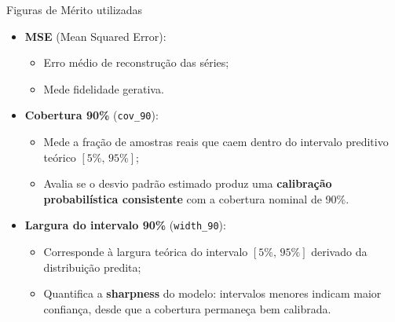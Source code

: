 \documentclass[10pt,aspectratio=169]{beamer}
\begin{document}
  \begin{frame}{Figuras de Mérito utilizadas}
     \begin{itemize}
    \item \textbf{MSE} (Mean Squared Error):
      \begin{itemize}
         \item Erro médio de reconstrução das séries;
    \item Mede fidelidade gerativa.
      \end{itemize}

  \item \textbf{Cobertura 90\%} (\texttt{cov\_90}):
  \begin{itemize}
    \item Mede a fração de amostras reais que caem dentro do
          intervalo preditivo teórico $[5\%,\,95\%]$;
    \item Avalia se o desvio padrão estimado produz uma
          \textbf{calibração probabilística consistente}
          com a cobertura nominal de 90\%.
  \end{itemize}

\item \textbf{Largura do intervalo 90\%} (\texttt{width\_90}):
  \begin{itemize}
    \item Corresponde à largura teórica do intervalo $[5\%,\,95\%]$
          derivado da distribuição predita;
    \item Quantifica a \textbf{sharpness} do modelo:
          intervalos menores indicam maior confiança,
          desde que a cobertura permaneça bem calibrada.
  \end{itemize}
    \end{itemize}
\end{frame}
\end{document}
